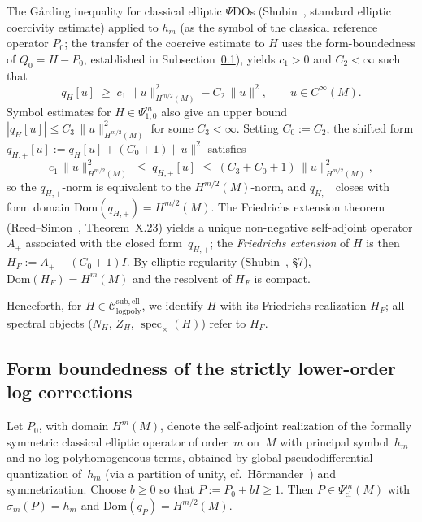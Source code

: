\documentclass[12pt]{amsart}
\newcommand{\Csub}{\mathcal{C}_{\mathrm{logpoly}}^{\mathrm{sub,ell}}}
\begin{document}
The G\r{a}rding inequality for classical elliptic $\Psi$DOs
(Shubin~\cite{Shubin2001}, standard elliptic coercivity estimate) applied to $h_m$
(as the symbol of the classical reference operator $P_0$; the transfer of the
coercive estimate to $H$ uses the form-boundedness of $Q_0=H-P_0$, established in
Subsection~\ref{subsec:formbdd}), yields
$c_1>0$ and $C_2<\infty$ such that
\[
  q_H[u] \;\ge\; c_1\,\|u\|^2_{H^{m/2}(M)} - C_2\,\|u\|^2,
  \qquad u\in C^\infty(M).
\]
Symbol estimates for $H\in\Psi^m_{1,0}$ also give an upper bound
$|q_H[u]|\le C_3\,\|u\|^2_{H^{m/2}(M)}$ for some $C_3<\infty$.
Setting $C_0 := C_2$, the shifted form
$q_{H,+}[u] := q_H[u] + (C_0+1)\|u\|^2$ satisfies
\[
  c_1\,\|u\|^2_{H^{m/2}(M)}
  \;\le\; q_{H,+}[u]
  \;\le\; (C_3+C_0+1)\,\|u\|^2_{H^{m/2}(M)},
\]
so the $q_{H,+}$-norm is equivalent to the $H^{m/2}(M)$-norm,
and $q_{H,+}$ closes with form domain $\mathrm{Dom}(q_{H,+})=H^{m/2}(M)$.
The Friedrichs extension theorem
(Reed--Simon~\cite{RS1975}, Theorem~X.23) yields a unique non-negative
self-adjoint operator $A_+$ associated with the closed form~$q_{H,+}$;
the \emph{Friedrichs extension} of $H$ is then $H_F := A_+ - (C_0+1)I$.
By elliptic regularity (Shubin~\cite{Shubin2001}, \S7),
$\mathrm{Dom}(H_F)=H^m(M)$ and the resolvent of $H_F$ is compact.

Henceforth, for $H\in\Csub$, we identify $H$ with its Friedrichs
realization $H_F$; all spectral objects ($N_H$, $Z_H$,
$\operatorname{spec}_\times(H)$) refer to $H_F$.

\subsection{Form boundedness of the strictly lower-order log corrections}
\label{subsec:formbdd}

Let $P_0$, with domain $H^m(M)$, denote the self-adjoint realization of
the formally symmetric classical elliptic operator of order~$m$ on~$M$
with principal symbol~$h_m$ and no log-polyhomogeneous terms, obtained by
global pseudodifferential quantization of~$h_m$ (via a partition of
unity, cf.~H\"ormander~\cite{Hormander1968}) and symmetrization.
Choose $b\ge 0$ so that $P:=P_0+bI\ge 1$.
Then $P\in\Psi^m_{\mathrm{cl}}(M)$ with $\sigma_m(P)=h_m$ and
$\mathrm{Dom}(q_P)=H^{m/2}(M)$.
\end{document}
